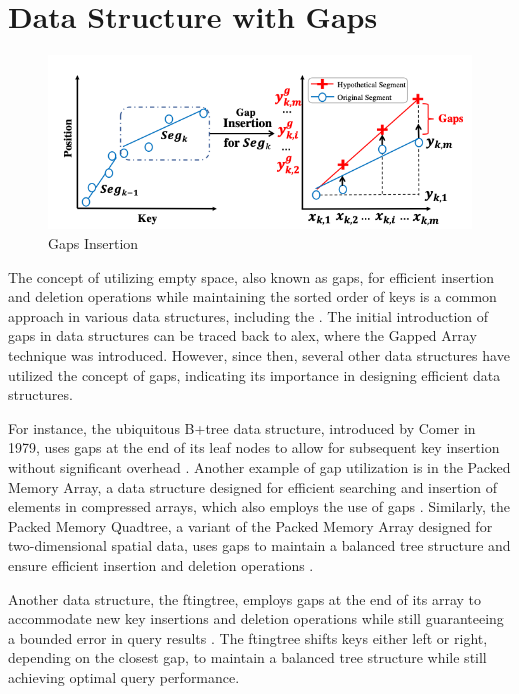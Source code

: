 \section{Data Structure with Gaps}
\begin{figure}
    \centering
    \includegraphics[width=120mm,scale=1]{Figures/gapsinsert.png}
    \caption{
        Gaps Insertion \cite{GapsInsertion}
    }
    \label{fig:gapsinsert}
\end{figure}

The concept of utilizing empty space, also known as gaps, for efficient insertion and deletion operations while maintaining the sorted order of keys is a common approach in various data structures, including the \learnindex\cite{ALEX,LIPP,PGM,fittingtree,FloodLMD,Tsunami, GapsInsertion}. The initial introduction of gaps in data structures can be traced back to \acrshort{alex}, where the \textsf{Gapped Array} technique was introduced. However, since then, several other data structures have utilized the concept of gaps, indicating its importance in designing efficient data structures.

For instance, the ubiquitous B+tree data structure, introduced by Comer in 1979, uses gaps at the end of its leaf nodes to allow for subsequent key insertion without significant overhead \cite{comer1979ubiquitous}. Another example of gap utilization is in the Packed Memory Array, a data structure designed for efficient searching and insertion of elements in compressed arrays, which also employs the use of gaps \cite{PackedMemoryArray}. Similarly, the Packed Memory Quadtree, a variant of the Packed Memory Array designed for two-dimensional spatial data, uses gaps to maintain a balanced tree structure and ensure efficient insertion and deletion operations \cite{packedquadtree}.

Another data structure, the \acrshort{ftingtree}, employs gaps at the end of its array to accommodate new key insertions and deletion operations while still guaranteeing a bounded error in query results \cite{fittingtree}. The \acrshort{ftingtree} shifts keys either left or right, depending on the closest gap, to maintain a balanced tree structure while still achieving optimal query performance.

